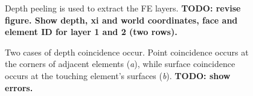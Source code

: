 \documentclass[review,journal]{vgtc}         %
\begin{document}
\begin{figure}[t]
    \caption{Depth peeling is used to extract the FE layers. \textbf{TODO: revise figure. Show depth, xi and world coordinates, face and element ID for layer 1 and 2 (two rows).}}
    \label{fig:depthpeeling}
\end{figure}

\begin{figure}[b]
  \centering 
  \caption{Two cases of depth coincidence occur. Point coincidence occurs at the corners of adjacent elements ({\it a}), while surface coincidence occurs at the touching element's surfaces ({\it b}). \textbf{TODO: show errors.}}
  \label{fig:depthcoincidence}
\end{figure}
\end{document}

